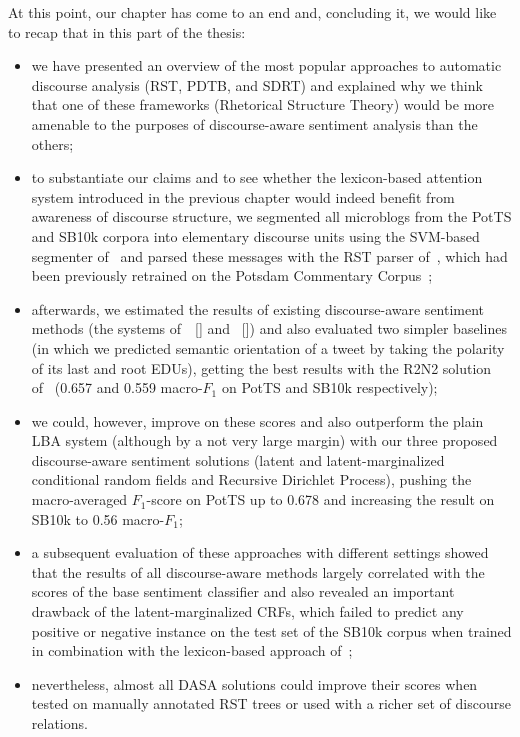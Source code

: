 \documentclass[11pt]{article}
\newcommand{\F}[0]{$F_1$}
\renewcommand{\cite}{\citep}
\begin{document}
At this point, our chapter has come to an end and, concluding it, we
would like to recap that in this part of the thesis:
\begin{itemize}
  \item we have presented an overview of the most popular approaches
    to automatic discourse analysis (RST, PDTB, and SDRT) and
    explained why we think that one of these frameworks (Rhetorical
    Structure Theory) would be more amenable to the purposes of
    discourse-aware sentiment analysis than the others;
  \item to substantiate our claims and to see whether the
    lexicon-based attention system introduced in the previous chapter
    would indeed benefit from awareness of discourse structure, we
    segmented all microblogs from the PotTS and SB10k corpora into
    elementary discourse units using the SVM-based segmenter
    of~\citet{Sidarenka:15} and parsed these messages with the RST
    parser of~\citet{Ji:14}, which had been previously retrained on
    the Potsdam Commentary Corpus~\cite{Stede:14};
  \item afterwards, we estimated the results of existing
    discourse-aware sentiment methods (the systems
    of~\citeauthor{Wang:15}~[\citeyear{Wang:15}] and
    \citeauthor{Bhatia:15}~[\citeyear{Bhatia:15}]) and also evaluated
    two simpler baselines (in which we predicted semantic orientation
    of a tweet by taking the polarity of its last and root EDUs),
    getting the best results with the R2N2 solution
    of~\citet{Bhatia:15} (0.657 and 0.559 macro-\F{} on PotTS and
    SB10k respectively);
  \item we could, however, improve on these scores and also outperform
    the plain LBA system (although by a not very large margin) with
    our three proposed discourse-aware sentiment solutions (latent and
    latent-marginalized conditional random fields and Recursive
    Dirichlet Process), pushing the macro-averaged \F{}-score on PotTS
    up to 0.678 and increasing the result on SB10k to 0.56 macro-\F{};
  \item a subsequent evaluation of these approaches with different
    settings showed that the results of all discourse-aware methods
    largely correlated with the scores of the base sentiment
    classifier and also revealed an important drawback of the
    latent-marginalized CRFs, which failed to predict any positive or
    negative instance on the test set of the SB10k corpus when trained
    in combination with the lexicon-based approach of~\citet{Hu:04};
  \item nevertheless, almost all DASA solutions could improve their
    scores when tested on manually annotated RST trees or used with a
    richer set of discourse relations.
\end{itemize}
\end{document}
